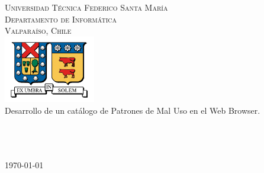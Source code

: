 \begin{titlepage}

\begin{center}

\textsc{\Large Universidad Técnica Federico Santa María}\\
\textsc{\large Departamento de Informática}\\
\textsc{\large Valparaíso, Chile}\\[1.5cm]

\includegraphics[width=0.3\textwidth]{figures/utfsm.jpg}\\[1cm]    

{ \huge Desarrollo de un catálogo de Patrones de Mal Uso en el Web Browser.}\\[2cm]

\\[2cm]
\\[3cm]
\\

\vfill

{\large \today}

\end{center}

\end{titlepage}
